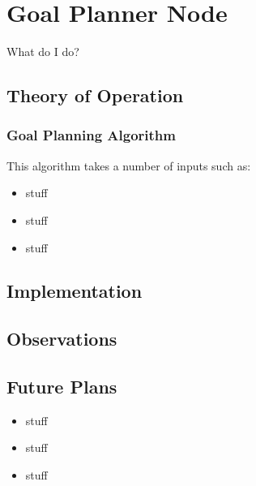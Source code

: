\section{Goal Planner Node}

What do I do?

\subsection{Theory of Operation}


\subsubsection{Goal Planning Algorithm}
 This algorithm takes a number
of inputs such as:


\begin{itemize}
\item
  stuff
\item
  stuff
\item
  stuff
\end{itemize}


\subsection{Implementation}



\subsection{Observations}


\subsection{Future Plans}

\begin{itemize}
\item
  stuff
\item
  stuff
\item
  stuff
\end{itemize}
